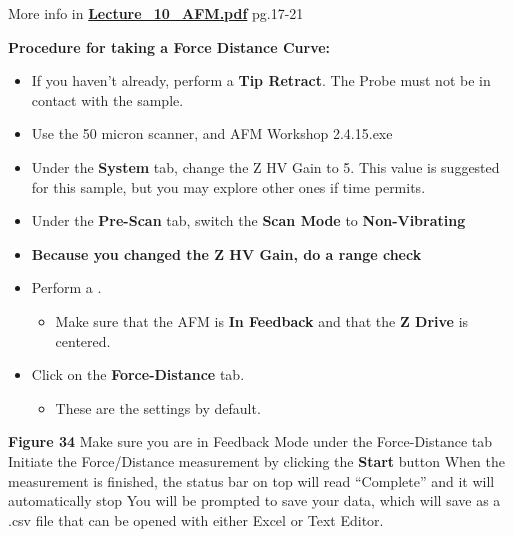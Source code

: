 \documentclass{../lab}
\begin{document}
More info in\textbf{ }\href{http://experimentationlab.berkeley.edu/sites/default/files/AFMImages/Lecture\_10\_AFM.pdf}{\textbf{Lecture\_10\_AFM.pdf}}\textbf{ } pg.17-21

\textbf{}

\textbf{Procedure for taking a Force Distance Curve:}

    \begin{itemize}
        \item If you haven’t already, perform a \textbf{Tip Retract}.  The Probe must not be in contact with the sample.

        \item Use the 50 micron scanner, and AFM Workshop 2.4.15.exe

        \item Under the \textbf{System} tab, change the Z HV Gain to 5.  This value is suggested for this sample, but you may explore other ones if time permits.

        \item Under the \textbf{Pre-Scan} tab, switch the \textbf{Scan Mode} to \textbf{Non-Vibrating}

        \item \textbf{Because you changed the Z HV Gain, do a range check}

        \item Perform a .

        \begin{itemize}
            \item Make sure that the AFM is \textbf{In Feedback} and that the \textbf{Z Drive} is centered.

        \end{itemize}

        \item Click on the \textbf{Force-Distance} tab.

        \begin{itemize}
            \item These are the settings by default.

        \end{itemize}

    \end{itemize}


\textbf{Figure 34}
Make sure you are in Feedback Mode under the Force-Distance tab
Initiate the Force/Distance measurement by clicking the \textbf{Start} button
When the measurement is finished, the status bar on top will read ``Complete'' and it will automatically stop
You will be prompted to save your data, which will save as a .csv file that can be opened with either Excel or Text Editor.
\end{document}

